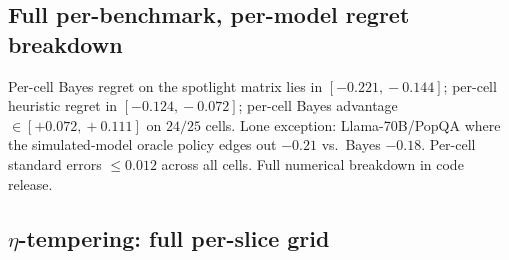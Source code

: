 \subsection{Full per-benchmark, per-model regret breakdown}
\label{app:full-breakdown}

Per-cell Bayes regret on the spotlight matrix lies in
$[-0.221,\!-0.144]$; per-cell heuristic regret in
$[-0.124,\!-0.072]$; per-cell Bayes advantage
$\in[+0.072,\!+0.111]$ on $24/25$ cells.  Lone exception:
Llama-70B/PopQA where the simulated-model oracle policy edges out
$-0.21$ vs.\ Bayes $-0.18$.  Per-cell standard errors $\le\!0.012$
across all cells.  Full numerical breakdown in code release.

\subsection{$\eta$-tempering: full per-slice grid}
\label{app:eta-grid}


